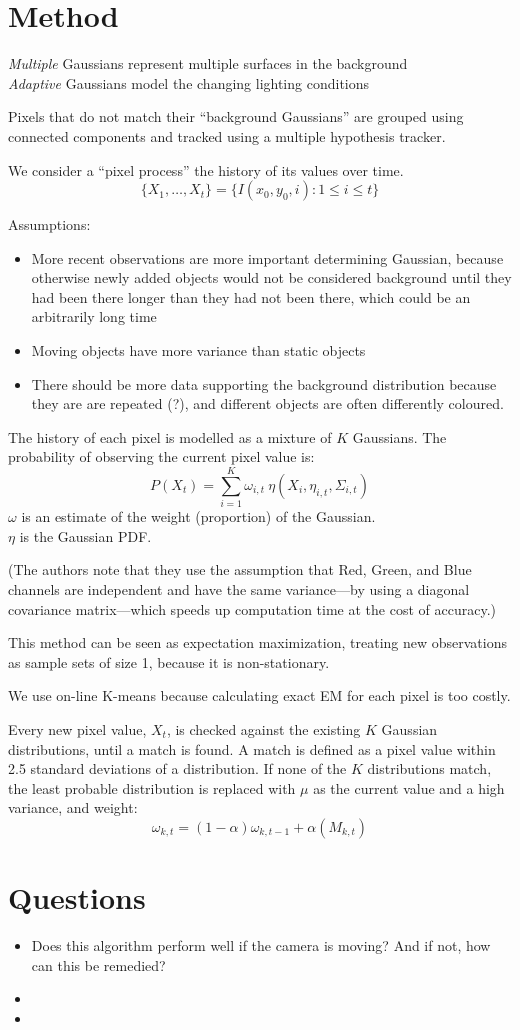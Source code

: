 \documentclass{article}
\begin{document}
\section{Method}
	\emph{Multiple} Gaussians represent multiple surfaces in the background\\
	\emph{Adaptive} Gaussians model the changing lighting conditions

	Pixels that do not match their ``background Gaussians'' are grouped using
	connected components and tracked using a multiple hypothesis tracker.

	We consider a ``pixel process'' the history of its values over time.
	$$\{X_1, \ldots, X_t \} = \{I(x_0, y_0, i) : 1 \leq i \leq t\}$$

	Assumptions:
	\begin{itemize}
		\item More recent observations are more important determining Gaussian,
			because otherwise newly added objects would not be considered
			background until they had been there longer than they had not been
			there, which could be an arbitrarily long time
		\item Moving objects have more variance than static objects
		\item There should be more data supporting the background distribution
			because they are are repeated (?), and different objects are often
			differently coloured.
	\end{itemize}

	The history of each pixel is modelled as a mixture of $K$ Gaussians. The
	probability of observing the current pixel value is:
	$$P(X_t) = \sum^K_{i=1} \omega_{i,t}~\eta
	(X_i, \eta_{i, t}, \Sigma_{i,t})$$
	$\omega$ is an estimate of the weight (proportion) of the Gaussian.\\
	$\eta$ is the Gaussian PDF.

	(The authors note that they use the assumption that Red, Green, and Blue
	channels are independent and have the same variance---by using a diagonal
	covariance matrix---which speeds up computation time at the cost of
	accuracy.)

	This method can be seen as expectation maximization, treating new
	observations as sample sets of size 1, because it is non-stationary.

	We use on-line K-means because calculating exact EM for each pixel is too
	costly.

	Every new pixel value, $X_t$, is checked against the existing $K$ Gaussian
	distributions, until a match is found. A match is defined as a pixel value
	within 2.5 standard deviations of a distribution.
	If none of the $K$ distributions match, the least probable distribution is
	replaced with $\mu$ as the current value and a high variance, and weight:
	$$\omega_{k,t} = (1 - \alpha) \omega_{k,t-1} + \alpha(M_{k,t})$$


\section{Questions}
	\begin{itemize}
		\item Does this algorithm perform well if the camera is moving? And if
			not, how can this be remedied?
		\item
		\item
	\end{itemize}
\end{document}
